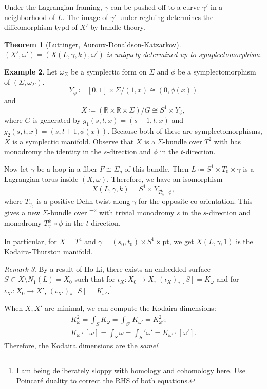 \documentclass[leqno, openany]{memoir}
\newtheorem{thm}{Theorem}[chapter]
\theoremstyle{definition}
\newtheorem{exm}[thm]{Example}
\theoremstyle{remark}
\newtheorem{rmk}[thm]{Remark}
\theoremstyle{plain}
\theoremstyle{definition}
\theoremstyle{remark}
\newcommand{\R}{\mathbb{R}}
\newcommand{\T}{\mathbb{T}}
\newcommand{\mr}[1]{\mathrm{#1}}
\begin{document}
    Under the Lagrangian framing, $\gamma$ can be pushed off to a curve $\gamma'$ in a neighborhood of $L$. The image of $\gamma'$ under regluing determines the diffeomorphism typd of $X'$ by handle theory.

    \begin{thm}[Luttinger, Auroux-Donaldson-Katzarkov]
        $(X',\omega') = (X(L, \gamma, k), \omega')$ is uniquely determined up to symplectomorphism.
    \end{thm}

    \begin{exm}
        Let $\omega_{\Sigma}$ be a symplectic form on $\Sigma$ and $\phi$ be a symplectomorphism of $(\Sigma, \omega_{\Sigma})$.
        \[ Y_{\phi} \coloneqq [0,1] \times \Sigma / (1,x) \cong (0,\phi(x)) \]
        and 
        \[ X \coloneqq (\R \times \R \times \Sigma) / G \cong S^1 \times Y_{\phi}, \]
        where $G$ is generated by $g_1(s,t,x) = (s+1,t,x)$ and $g_2(s,t,x) = (s,t+1,\phi(x))$. Because both of these are symplectomorphisms, $X$ is a symplectic manifold. Observe that $X$ is a $\Sigma$-bundle over $T^2$ with has monodromy the identity in the $s$-direction and $\phi$ in the $t$-direction. 

        Now let $\gamma$ be a loop in a fiber $F \cong \Sigma_g$ of this bundle. Then $L \coloneqq S^1 \times T_0 \times \gamma$ is a Lagrangian torus inside $(X, \omega)$. Therefore, we have an isomorphism
        \[ X(L, \gamma, k) = S^1 \times Y_{T_{\gamma_0}^k \circ \phi}, \]
        where $T_{\gamma_0}$ is a positive Dehn twist along $\gamma$ for the opposite co-orientation. This gives a new $\Sigma$-bundle over $\T^2$ with trivial monodromy $s$ in the $s$-direction and monodromy $T_{\gamma_0}^k \circ \phi$ in the $t$-direction.

        In particular, for $X = T^4$ and $\gamma = (s_0,t_0) \times S^1 \times \mr{pt}$, we get $X(L, \gamma, 1)$ is the Kodaira-Thurston manifold.
    \end{exm}

    \begin{rmk}
        By a result of Ho-Li, there exists an embedded surface $S \subset X \setminus N_1(L) = X_0$ such that for $\iota_X: X_0 \to X$, $(\iota_X)_* [S] = K_{\omega}$ and for $\iota_{X'}: X_0 \to X'$, $(\iota_{X'})_* [S] = K_{\omega'}$.\footnote{I am being deliberately sloppy with homology and cohomology here. Use Poincar\'e duality to correct the RHS of both equations.}

        When $X, X'$ are minimal, we can compute the Kodaira dimensions:
        \begin{align*}
            K^2_{\omega} = \int_S K_{\omega} = \int_{S'} K_{\omega'} = K_{\omega'}^2; \\
            K_{\omega} \cdot [\omega] = \int_S \omega = \int_S' \omega' = K_{\omega'} \cdot [\omega']. 
        \end{align*}
        Therefore, the Kodaira dimensions are the \textit{same!}.
    \end{rmk}
\end{document}
